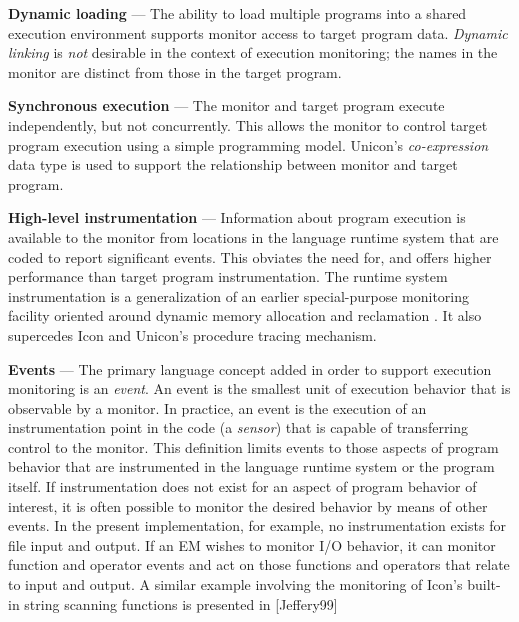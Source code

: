 \begin{list}{}{\itemsep 7pt}
\item [{\bf Dynamic loading}] --- The ability to load multiple programs
	into a shared execution environment supports
	monitor access to target program data.
	{\em Dynamic linking\/} is {\em not\/} desirable in the
	context of execution monitoring; the names in the
	monitor are distinct from those in the target program. 
\item [{\bf Synchronous execution}] --- The monitor and target program execute
	independently, but not concurrently.  This allows the monitor
	to control target program execution using a simple programming model.
	Unicon's {\em co-expression\/} data type is used to support the
	relationship between monitor and target program.
\item [{\bf High-level instrumentation}] --- Information
	about program execution is available to the monitor from
	locations in the language runtime system that are coded to report
	significant events.  This obviates the need for, and
	offers higher performance than target program
	instrumentation.  The runtime system instrumentation is a
	generalization of an earlier special-purpose
	monitoring facility oriented around dynamic memory allocation
	and reclamation \cite{Town89}.
	It also supercedes Icon and Unicon's procedure
	tracing mechanism.
\item [{\bf Events}] --- 
	The primary language concept added in order to support execution
	monitoring is an {\em event\/}.  An event is the smallest unit of
	execution behavior that is observable by a monitor.  In practice, an
	event is the execution of an instrumentation point in the code
	(a {\em sensor\/}) 
	that is capable of transferring control to the monitor.
	This definition limits events to those aspects of program behavior
	that are instrumented in the language runtime system or the program
	itself. If instrumentation
	does not exist for an aspect of program behavior of interest, it is
	often possible to monitor the desired behavior by means of other
	events. In the present implementation, for example, no instrumentation
	exists for file input and output.  If an EM wishes to monitor I/O
	behavior, it can monitor function and operator events and act on
	those functions and operators that relate to input and output.
	A similar example involving the monitoring of Icon's built-in
	string scanning functions is presented in [Jeffery99]


\end{list}
